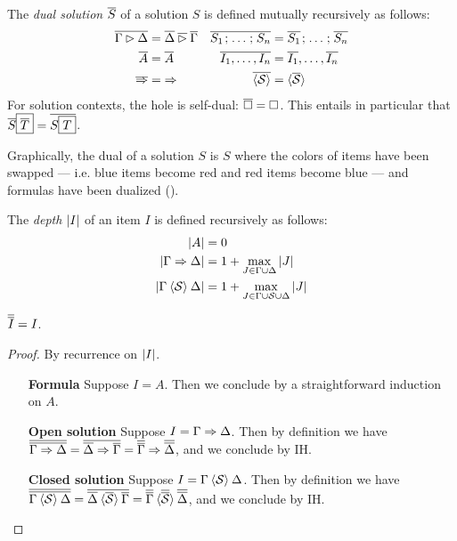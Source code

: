 \begin{definition}
  The \emph{dual solution} $\overline{S}$ of a solution $S$ is defined
  mutually recursively as follows:
  \begin{align*}
    \soldual{\Gamma \J \Delta} &= \soldual{\Delta} \mathbin{\soldual{\J}} \soldual{\Gamma} &
    \soldual{S_1 \sep \ldots \sep S_n} &= \soldual{S_1} \sep \ldots \sep \soldual{S_n} \\
    \soldual{A} &= \soldual{A} &
    \soldual{I_1, \ldots, I_n} &= \soldual{I_1}, \ldots, \soldual{I_n} \\
    \soldual{\seq} &= {\seq} &
    \soldual{\piq{\mathcal{S}}} &= \piq{\soldual{\mathcal{S}}}
  \end{align*}
  For solution contexts, the hole is self-dual: $\overline{\square} = \square$. This
  entails in particular that $\overline{S}\fbox{$\overline{T}$} =
  \overline{S\fbox{$T$}}$.
\end{definition}

Graphically, the dual of a solution $S$ is $S$ where the colors of items have
been swapped --- i.e. blue items become red and red items become blue --- and
formulas have been dualized ().

\begin{definition}
  The \emph{depth} $\left|I\right|$ of an item $I$ is defined recursively as
  follows:
  \begin{align*}
    \left|A\right| &= 0 \\
    \left|\Gamma \Rightarrow \Delta\right| &= 1 + \max_{J \in \Gamma \cup \Delta}{\left|J\right|} \\
    \left|\Gamma \mathbin{\langle \mathcal{S} \rangle} \Delta\right| &= 1 + \max_{J \in \Gamma \cup \mathcal{S} \cup \Delta}{\left|J\right|}
  \end{align*}
\end{definition}

\begin{lemma}[Involutivity]
  $\overline{\overline{I}} = I$.
\end{lemma}
\begin{proof}
  By recurrence on $\left|I\right|$.
  \begin{itemize}
    \item[\textbf{Formula}] Suppose $I = A$. Then we conclude by a
    straightforward induction on $A$.
    \item[\textbf{Open solution}] Suppose $I = \Gamma \Rightarrow \Delta$. Then by
    definition we have $\overline{\overline{\Gamma \Rightarrow \Delta}} =
    \overline{\overline{\Delta} \Rightarrow \overline{\Gamma}} =
    \overline{\overline{\Gamma}} \Rightarrow \overline{\overline{\Delta}}$, and we conclude
    by IH.
    \item[\textbf{Closed solution}] Suppose $I = \Gamma \mathbin{\langle \mathcal{S} \rangle}
    \Delta$. Then by definition we have $\overline{\overline{\Gamma
    \mathbin{\langle \mathcal{S} \rangle} \Delta}} = \overline{\overline{\Delta}
    \mathbin{\langle \overline{\mathcal{S}} \rangle} \overline{\Gamma}} =
    \overline{\overline{\Gamma}} \mathbin{\langle \overline{\overline{\mathcal{S}}} \rangle}
    \overline{\overline{\Delta}}$, and we conclude by IH.
  \end{itemize}
\end{proof}

